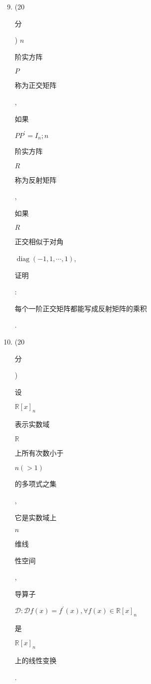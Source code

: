 \documentclass[10pt]{article}
\begin{document}
\begin{enumerate}
  \setcounter{enumi}{8}
  \item (20 \begin{CJK}{UTF8}{mj}分\end{CJK}) $n$ \begin{CJK}{UTF8}{mj}阶实方阵\end{CJK} $P$ \begin{CJK}{UTF8}{mj}称为正交矩阵\end{CJK}, \begin{CJK}{UTF8}{mj}如果\end{CJK} $P P^{\prime}=I_{n} ; n$ \begin{CJK}{UTF8}{mj}阶实方阵\end{CJK} $R$ \begin{CJK}{UTF8}{mj}称为反射矩阵\end{CJK}, \begin{CJK}{UTF8}{mj}如果\end{CJK} $R$ \begin{CJK}{UTF8}{mj}正交相似于对角\end{CJK} $\operatorname{diag}(-1,1, \cdots, 1)$, \begin{CJK}{UTF8}{mj}证明\end{CJK}: \begin{CJK}{UTF8}{mj}每个一阶正交矩阵都能写成反射矩阵的乘积\end{CJK}.

  \item (20 \begin{CJK}{UTF8}{mj}分\end{CJK}) \begin{CJK}{UTF8}{mj}设\end{CJK} $\mathbb{R}[x]_{n}$ \begin{CJK}{UTF8}{mj}表示实数域\end{CJK} $\mathbb{R}$ \begin{CJK}{UTF8}{mj}上所有次数小于\end{CJK} $n(>1)$ \begin{CJK}{UTF8}{mj}的多项式之集\end{CJK}, \begin{CJK}{UTF8}{mj}它是实数域上\end{CJK} $n$ \begin{CJK}{UTF8}{mj}维线\end{CJK} \begin{CJK}{UTF8}{mj}性空间\end{CJK}, \begin{CJK}{UTF8}{mj}导算子\end{CJK} $\mathscr{D}: \mathscr{D} f(x)=f^{\prime}(x), \forall f(x) \in \mathbb{R}[x]_{n}$ \begin{CJK}{UTF8}{mj}是\end{CJK} $\mathbb{R}[x]_{n}$ \begin{CJK}{UTF8}{mj}上的线性变换\end{CJK}.

\end{enumerate}
\end{document}
